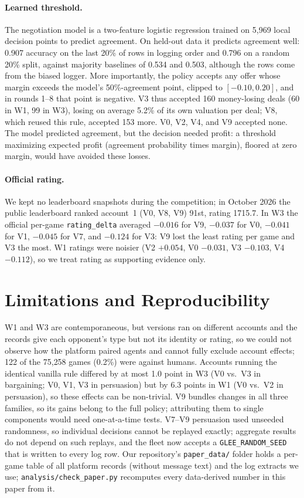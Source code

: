 \documentclass{article}
\begin{document}
\paragraph{Learned threshold.}
The negotiation model is a two-feature logistic regression trained on 5{,}969 local decision points to predict agreement. On held-out data it predicts agreement well: 0.907 accuracy on the last 20\% of rows in logging order and 0.796 on a random 20\% split, against majority baselines of 0.534 and 0.503, although the rows come from the biased logger. More importantly, the policy accepts any offer whose margin exceeds the model's 50\%-agreement point, clipped to $[-0.10, 0.20]$, and in rounds 1--8 that point is negative. V3 thus accepted 160 money-losing deals (60 in W1, 99 in W3), losing on average 5.2\% of its own valuation per deal; V8, which reused this rule, accepted 153 more. V0, V2, V4, and V9 accepted none. The model predicted agreement, but the decision needed profit: a threshold maximizing expected profit (agreement probability times margin), floored at zero margin, would have avoided these losses.

\paragraph{Official rating.}
We kept no leaderboard snapshots during the competition; in October 2026 the public leaderboard ranked account~1 (V0, V8, V9) 91st, rating 1715.7. In W3 the official per-game \texttt{rating\_delta} averaged $-0.016$ for V9, $-0.037$ for V0, $-0.041$ for V1, $-0.045$ for V7, and $-0.124$ for V3: V9 lost the least rating per game and V3 the most. W1 ratings were noisier (V2 $+0.054$, V0 $-0.031$, V3 $-0.103$, V4 $-0.112$), so we treat rating as supporting evidence only.

\section{Limitations and Reproducibility}

W1 and W3 are contemporaneous, but versions ran on different accounts and the records give each opponent's type but not its identity or rating, so we could not observe how the platform paired agents and cannot fully exclude account effects; 122 of the 75{,}258 games (0.2\%) were against humans. Accounts running the identical vanilla rule differed by at most 1.0 point in W3 (V0 vs.\ V3 in bargaining; V0, V1, V3 in persuasion) but by 6.3 points in W1 (V0 vs.\ V2 in persuasion), so these effects can be non-trivial. V9 bundles changes in all three families, so its gains belong to the full policy; attributing them to single components would need one-at-a-time tests. V7--V9 persuasion used unseeded randomness, so individual decisions cannot be replayed exactly; aggregate results do not depend on such replays, and the fleet now accepts a \texttt{GLEE\_RANDOM\_SEED} that is written to every log row. Our repository's \texttt{paper\_data/} folder holds a per-game table of all platform records (without message text) and the log extracts we use; \texttt{analysis/check\_paper.py} recomputes every data-derived number in this paper from it.
\end{document}
